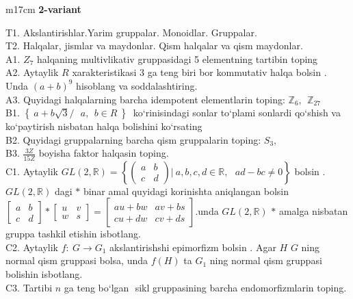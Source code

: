 \documentclass{article}
\begin{document}
\begin{tabular}{m{17cm}}
\textbf{2-variant}
\newline

T1. Akslantirishlar.Yarim gruppalar. Monoidlar. Gruppalar. \\
T2. Halqalar, jismlar va maydonlar. Qism halqalar va qism maydonlar. \\
A1. \(Z_{7}\) halqaning multivlikativ gruppasidagi 5 elementning tartibin toping \\
A2. Aytaylik \(R\) xarakteristikasi 3 ga teng biri bor kommutativ halqa bo\textquotesingle lsin . Unda \((a + b)^{9}\) hisoblang va soddalashtiring. \\
A3. Quyidagi halqalarning barcha idempotent elementlarin toping: \(\mathbb{Z}_{6},\ \ \mathbb{Z}_{27}\) \\
B1. \(\left\{ \left. \ a + b\sqrt{3}/\ \ \ a,\ \ b \in R\  \right\} \right.\ \) ko`rinisindagi sonlar to`plami sonlardi qo`shish va ko`paytirish nisbatan halqa bolishini ko`rsating \\
B2. Quyidagi gruppalarning barcha qism gruppalarin toping: \(S_{3},\) \\
B3. \(\frac{3Z}{15Z}\) boyisha faktor halqasin toping. \\
C1. Aytaylik \(GL(2,\mathbb{R}) = \left\{ \begin{pmatrix}
a & b \\
c & d
\end{pmatrix}|\ a,b,c,d\mathbb{\in R},\ \ \ ad - bc \neq 0 \right\}\) bo\textquotesingle lsin . \(GL(2,\mathbb{R})\) dagi \(*\) binar amal quyidagi ko\textquotesingle rinishta aniqlangan bo\textquotesingle lsin \(\begin{bmatrix}
a & b \\
c & d
\end{bmatrix}*\begin{bmatrix}
u & v \\
w & s
\end{bmatrix} = \begin{bmatrix}
au + bw & av + bs \\
cu + dw & cv + ds
\end{bmatrix}\).unda \(GL(2,\mathbb{R})\) \(*\) amalga nisbatan gruppa tashkil etishin isbotlang. \\
C2. Aytaylik \(f:\ G \rightarrow G_{1}\) akslantirishshi epimorfizm bo\textquotesingle lsin . Agar \(H\) \(G\) ning normal qism gruppasi bolsa, unda \(f(H)\) ta \(G_{1}\) ning normal qism gruppasi bolishin isbotlang. \\
C3. Tartibi \(n\) ga teng bo`lgan \(< a >\) sikl gruppasining barcha endomorfizmlarin toping. \\

\end{tabular}
\vspace{1cm}
\end{document}
